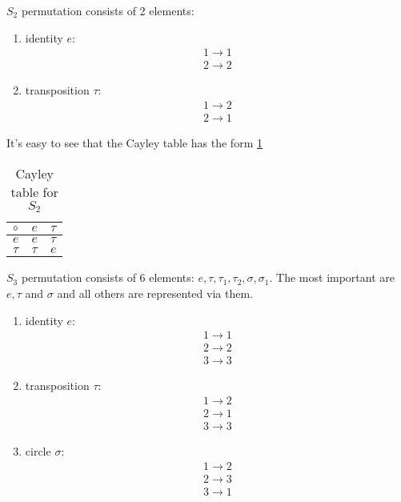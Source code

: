 \begin{appendices}
\begin{example}[$S_n$ group]
  $S_2$ permutation consists of 2 elements:
  \begin{enumerate}
  \item identity $e$:
    \[
    \begin{array}{c}
    1 \to 1 \\
    2 \to 2
    \end{array}
    \]
  \item transposition $\tau$:
    \[
    \begin{array}{c}
    1 \to 2 \\
    2 \to 1
    \end{array}
    \]    
  \end{enumerate}
  It's easy to see that the Cayley table has the form \ref{tab:CayleyS2}
    \begin{table}
    \centering
    \caption{Cayley table for $S_2$}
    \label{tab:CayleyS2}
    \begin{tabular}{l|ll}
      \toprule
      $\circ$ & $e$ & $\tau$ \\
      \midrule
      $e$ & $e$ & $\tau$ \\
      $\tau$ & $\tau$ & $e$ \\
      \bottomrule
    \end{tabular}
    \end{table}

    $S_3$ permutation consists of 6 elements: $e, \tau, \tau_1, \tau_2,
    \sigma, \sigma_1$. The most important are $e, \tau$ and $\sigma$
    and all others are represented via them.
  \begin{enumerate}
  \item identity $e$:
    \[
    \begin{array}{c}
    1 \to 1 \\
    2 \to 2 \\
    3 \to 3
    \end{array}
    \]
  \item transposition $\tau$:
    \[
    \begin{array}{c}
    1 \to 2 \\
    2 \to 1 \\
    3 \to 3
    \end{array}
    \]    
  \item circle $\sigma$:
    \[
    \begin{array}{c}
    1 \to 2 \\
    2 \to 3 \\
    3 \to 1
    \end{array}
    \]    
  \end{enumerate}  
  \label{ex:sngroup}
\end{example}


\end{appendices}
